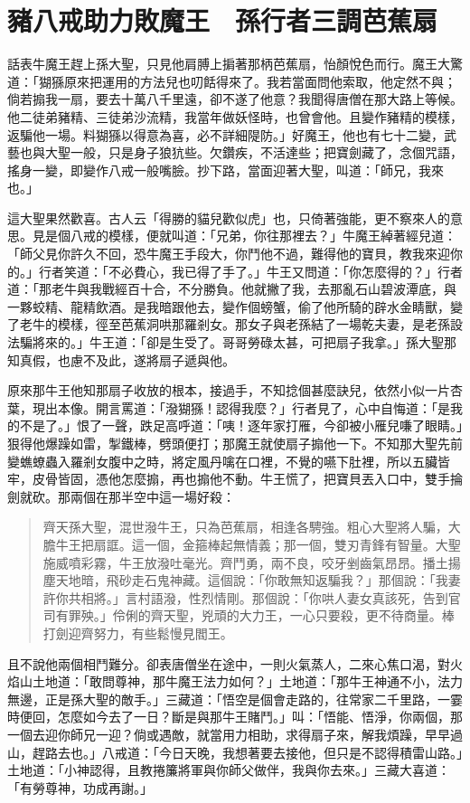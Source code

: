 
\chapter{豬八戒助力敗魔王　孫行者三調芭蕉扇}

話表牛魔王趕上孫大聖，只見他肩膊上掮著那柄芭蕉扇，怡顏悅色而行。魔王大驚道：「猢猻原來把運用的方法兒也叨餂得來了。我若當面問他索取，他定然不與；倘若搧我一扇，要去十萬八千里遠，卻不遂了他意？我聞得唐僧在那大路上等候。他二徒弟豬精、三徒弟沙流精，我當年做妖怪時，也曾會他。且變作豬精的模樣，返騙他一場。料猢猻以得意為喜，必不詳細隄防。」好魔王，他也有七十二變，武藝也與大聖一般，只是身子狼犺些。欠鑽疾，不活達些；把寶劍藏了，念個咒語，搖身一變，即變作八戒一般嘴臉。抄下路，當面迎著大聖，叫道：「師兄，我來也。」

這大聖果然歡喜。古人云「得勝的貓兒歡似虎」也，只倚著強能，更不察來人的意思。見是個八戒的模樣，便就叫道：「兄弟，你往那裡去？」牛魔王綽著經兒道：「師父見你許久不回，恐牛魔王手段大，你鬥他不過，難得他的寶貝，教我來迎你的。」行者笑道：「不必費心，我已得了手了。」牛王又問道：「你怎麼得的？」行者道：「那老牛與我戰經百十合，不分勝負。他就撇了我，去那亂石山碧波潭底，與一夥蛟精、龍精飲酒。是我暗跟他去，變作個螃蟹，偷了他所騎的辟水金睛獸，變了老牛的模樣，徑至芭蕉洞哄那羅剎女。那女子與老孫結了一場乾夫妻，是老孫設法騙將來的。」牛王道：「卻是生受了。哥哥勞碌太甚，可把扇子我拿。」孫大聖那知真假，也慮不及此，遂將扇子遞與他。

原來那牛王他知那扇子收放的根本，接過手，不知捻個甚麼訣兒，依然小似一片杏葉，現出本像。開言罵道：「潑猢猻！認得我麼？」行者見了，心中自悔道：「是我的不是了。」恨了一聲，跌足高呼道：「咦！逐年家打雁，今卻被小雁兒嗛了眼睛。」狠得他爆躁如雷，掣鐵棒，劈頭便打；那魔王就使扇子搧他一下。不知那大聖先前變蟭蟟蟲入羅剎女腹中之時，將定風丹噙在口裡，不覺的嚥下肚裡，所以五臟皆牢，皮骨皆固，憑他怎麼搧，再也搧他不動。牛王慌了，把寶貝丟入口中，雙手掄劍就砍。那兩個在那半空中這一場好殺：
\begin{quote}
齊天孫大聖，混世潑牛王，只為芭蕉扇，相逢各騁強。粗心大聖將人騙，大膽牛王把扇誆。這一個，金箍棒起無情義；那一個，雙刃青鋒有智量。大聖施威噴彩霧，牛王放潑吐毫光。齊鬥勇，兩不良，咬牙剉齒氣昂昂。播土揚塵天地暗，飛砂走石鬼神藏。這個說：「你敢無知返騙我？」那個說：「我妻許你共相將。」言村語潑，性烈情剛。那個說：「你哄人妻女真該死，告到官司有罪殃。」伶俐的齊天聖，兇頑的大力王，一心只要殺，更不待商量。棒打劍迎齊努力，有些鬆慢見閻王。
\end{quote}

且不說他兩個相鬥難分。卻表唐僧坐在途中，一則火氣蒸人，二來心焦口渴，對火焰山土地道：「敢問尊神，那牛魔王法力如何？」土地道：「那牛王神通不小，法力無邊，正是孫大聖的敵手。」三藏道：「悟空是個會走路的，往常家二千里路，一霎時便回，怎麼如今去了一日？斷是與那牛王賭鬥。」叫：「悟能、悟淨，你兩個，那一個去迎你師兄一迎？倘或遇敵，就當用力相助，求得扇子來，解我煩躁，早早過山，趕路去也。」八戒道：「今日天晚，我想著要去接他，但只是不認得積雷山路。」土地道：「小神認得，且教捲簾將軍與你師父做伴，我與你去來。」三藏大喜道：「有勞尊神，功成再謝。」

